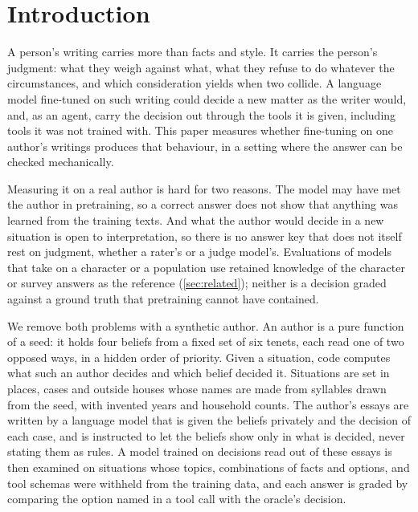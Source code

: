 
\section{Introduction}\label{sec:intro}

A person's writing carries more than facts and style. It carries the person's judgment:
what they weigh against what, what they refuse to do whatever the circumstances, and which
consideration yields when two collide. A language model fine-tuned on such writing could
decide a new matter as the writer would, and, as an agent, carry the decision out through the
tools it is given, including tools it was not trained with. This paper measures whether
fine-tuning on one author's writings produces that behaviour, in a setting where the answer
can be checked mechanically.

Measuring it on a real author is hard for two reasons. The model may have met the author in
pretraining, so a correct answer does not show that anything was learned from the training
texts. And what the author would decide in a new situation is open to interpretation, so
there is no answer key that does not itself rest on judgment, whether a rater's or a judge
model's. Evaluations of models that take on a character or a population use retained
knowledge of the character or survey answers as the reference (\cref{sec:related}); neither
is a decision graded against a ground truth that pretraining cannot have contained.

We remove both problems with a synthetic author. An author is a pure function of a seed: it
holds four beliefs from a fixed set of six tenets, each read one of two opposed ways, in a
hidden order of priority. Given a situation, code computes what such an author decides and
which belief decided it. Situations are set in places, cases and outside houses whose names
are made from syllables drawn from the seed, with invented years and household counts. The
author's essays are written by a language model that is given the beliefs privately and the
decision of each case, and is instructed to let the beliefs show only in what is decided,
never stating them as rules. A model trained on decisions read out of these essays is then
examined on situations whose topics, combinations of facts and options, and tool schemas
were withheld from the training data, and each answer is graded by comparing the option named
in a tool call with the oracle's decision.

